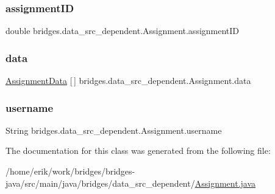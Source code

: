 \subsubsection{\texorpdfstring{assignment\+ID}{assignmentID}}
{\footnotesize\ttfamily double bridges.\+data\+\_\+src\+\_\+dependent.\+Assignment.\+assignment\+ID}

\mbox{\label{classbridges_1_1data__src__dependent_1_1_assignment_a23d503c5e6eae939bb8262dc8e18c259}} 
\subsubsection{\texorpdfstring{data}{data}}
{\footnotesize\ttfamily \hyperlink{classbridges_1_1data__src__dependent_1_1_assignment_data}{Assignment\+Data} \mbox{[}$\,$\mbox{]} bridges.\+data\+\_\+src\+\_\+dependent.\+Assignment.\+data}

\mbox{\label{classbridges_1_1data__src__dependent_1_1_assignment_aa7326ba8e0eb02fff4e5b22e4b89e61d}} 
\subsubsection{\texorpdfstring{username}{username}}
{\footnotesize\ttfamily String bridges.\+data\+\_\+src\+\_\+dependent.\+Assignment.\+username}



The documentation for this class was generated from the following file\+:\begin{DoxyCompactItemize}
\item 
/home/erik/work/bridges/bridges-\/java/src/main/java/bridges/data\+\_\+src\+\_\+dependent/\hyperlink{_assignment_8java}{Assignment.\+java}\end{DoxyCompactItemize}

